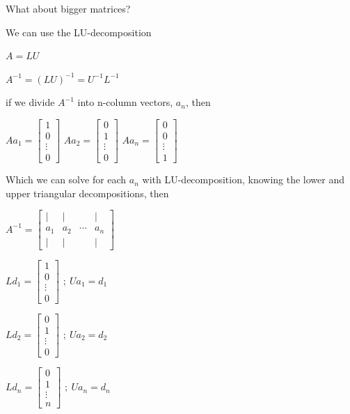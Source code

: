 \documentclass[11pt]{article}
\begin{document}
    What about bigger matrices?

We can use the LU-decomposition

\(A=LU\)

\(A^{-1}=(LU)^{-1}=U^{-1}L^{-1}\)

if we divide \(A^{-1}\) into n-column vectors, \(a_{n}\), then

\(Aa_{1}=\left[\begin{array}{c} 1 \\ 0 \\ \vdots \\ 0 \end{array} \right]\)
\(Aa_{2}=\left[\begin{array}{c} 0 \\ 1 \\ \vdots \\ 0 \end{array} \right]\)
\(Aa_{n}=\left[\begin{array}{c} 0 \\ 0 \\ \vdots \\ 1 \end{array} \right]\)

Which we can solve for each \(a_{n}\) with LU-decomposition, knowing the
lower and upper triangular decompositions, then

\(A^{-1}=\left[ \begin{array}{cccc} | & | & & | \\ a_{1} & a_{2} & \cdots & a_{n} \\ | & | & & | \end{array} \right]\)

\(Ld_{1}=\left[\begin{array}{c} 1 \\ 0 \\ \vdots \\ 0 \end{array} \right]\)
\(;~Ua_{1}=d_{1}\)

\(Ld_{2}=\left[\begin{array}{c} 0 \\ 1 \\ \vdots \\ 0 \end{array} \right]\)
\(;~Ua_{2}=d_{2}\)

\(Ld_{n}=\left[\begin{array}{c} 0 \\ 1 \\ \vdots \\ n \end{array} \right]\)
\(;~Ua_{n}=d_{n}\)
\end{document}
